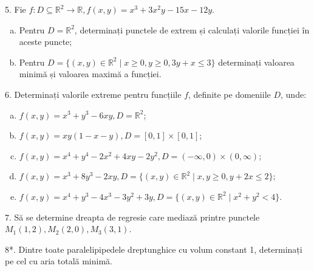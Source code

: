 \documentclass[11pt,a4paper]{article}
\newcommand\seq{\subseteq}
\newcommand\RR{\mathbb{R}}
\theoremstyle{dotless}
\theoremstyle{dotlessdr}
\begin{document}
\vspace{1cm}

5. Fie $f : D \seq \RR^2 \to \RR, f(x, y) = x^3 + 3x^2 y - 15x - 12 y$.
\begin{enumerate}[(a)]
\item Pentru $D = \RR^2$, determinați punctele de extrem și calculați
  valorile funcției în aceste puncte;
\item Pentru $D = \{ (x, y) \in \RR^2 \mid x \geq 0, y \geq 0, 3y + x \leq 3 \}$
  determinați valoarea minimă și valoarea maximă a funcției.
\end{enumerate}

\vspace{1cm}

6. Determinați valorile extreme pentru funcțiile $f$, definite pe domeniile $D$,
unde:
\begin{enumerate}[(a)]
\item $f(x, y) = x^3 + y^3 - 6xy, D = \RR^2$;
\item $f(x, y) = xy(1 - x - y), D = [0, 1] \times [0, 1]$;
\item $f(x, y) = x^4 + y^4 - 2x^2 + 4xy - 2y^2, D = (-\infty, 0) \times (0, \infty)$;
\item $f(x, y) = x^3 + 8y^3 - 2xy, D = \{(x, y) \in \RR^2 \mid x, y \geq 0, y + 2x \leq 2\}$;
\item $f(x, y) = x^4 + y^3 - 4x^3 - 3y^2 + 3y, D = \{ (x, y) \in \RR^2 \mid x^2 + y^2 < 4 \}$.
\end{enumerate}

\vspace{1cm}

7. Să se determine dreapta de regresie care mediază printre punctele
$M_1(1, 2), M_2(2, 0), M_3(3, 1)$.

\vspace{1cm}

8*. Dintre toate paralelipipedele dreptunghice cu volum constant 1, determinați
pe cel cu aria totală minimă.
\end{document}
